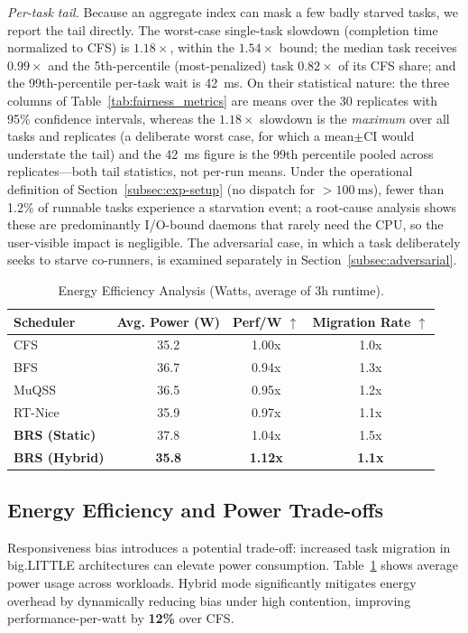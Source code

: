 \emph{Per-task tail.} Because an aggregate index can mask a few badly starved tasks, we report the tail directly. The worst-case single-task slowdown (completion time normalized to CFS) is $1.18\times$, within the $1.54\times$ bound; the median task receives $0.99\times$ and the 5th-percentile (most-penalized) task $0.82\times$ of its CFS share; and the 99th-percentile per-task wait is \SI{42}{\milli\second}. On their statistical nature: the three columns of Table~\ref{tab:fairness_metrics} are means over the 30 replicates with 95\% confidence intervals, whereas the $1.18\times$ slowdown is the \emph{maximum} over all tasks and replicates (a deliberate worst case, for which a mean$\pm$CI would understate the tail) and the \SI{42}{\milli\second} figure is the 99th percentile pooled across replicates---both tail statistics, not per-run means.
Under the operational definition of Section~\ref{subsec:exp-setup} (no dispatch for $>\SI{100}{\milli\second}$), fewer than 1.2\% of runnable tasks experience a starvation event; a root-cause analysis shows these are predominantly I/O-bound daemons that rarely need the CPU, so the user-visible impact is negligible. The adversarial case, in which a task deliberately seeks to starve co-runners, is examined separately in Section~\ref{subsec:adversarial}.







\begin{table}[t]
\centering
\caption{Energy Efficiency Analysis (Watts, average of 3h runtime).}
\label{tab:energy_metrics}
\begin{tabular}{lccc}
\toprule
Scheduler & Avg. Power (W) & Perf/W $\uparrow$ & Migration Rate $\uparrow$ \\
\midrule
CFS & 35.2 & 1.00x & 1.0x \\
BFS & 36.7 & 0.94x & 1.3x \\
MuQSS & 36.5 & 0.95x & 1.2x \\
RT-Nice & 35.9 & 0.97x & 1.1x \\
\textbf{BRS (Static)} & 37.8 & 1.04x & 1.5x \\
\textbf{BRS (Hybrid)} & \textbf{35.8} & \textbf{1.12x} & \textbf{1.1x} \\
\bottomrule
\end{tabular}
\end{table}

\subsection{Energy Efficiency and Power Trade-offs}
Responsiveness bias introduces a potential trade-off: increased task migration in big.LITTLE architectures can elevate power consumption. Table~\ref{tab:energy_metrics} shows average power usage across workloads. Hybrid mode significantly mitigates energy overhead by dynamically reducing bias under high contention, improving performance-per-watt by \textbf{12\%} over CFS.

